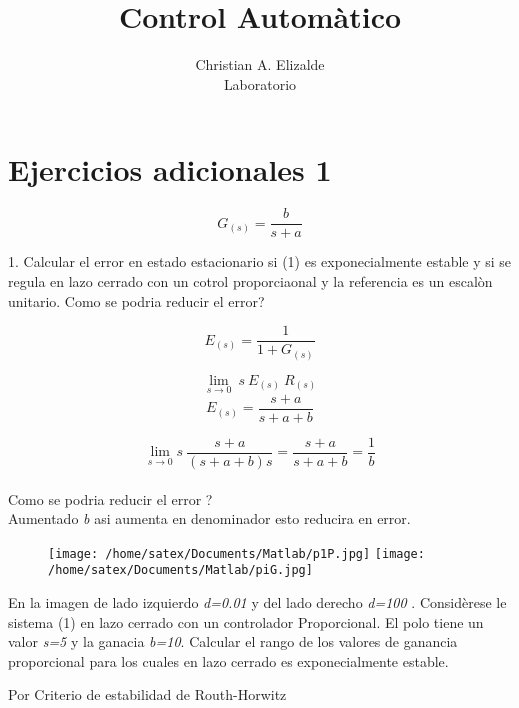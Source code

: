 \documentclass[11pt]{article}
\title{\textbf{Control Autom\`atico}}
\author{Christian A. Elizalde \\ Laboratorio}
\date{}
\begin{document}
\maketitle

\section{Ejercicios adicionales 1}
		\begin{equation}
	G_{(s)} = \frac{b}{s+a}
	\end{equation}

1. Calcular el error en estado estacionario si (1) es exponecialmente estable y si se regula en lazo cerrado con un cotrol proporciaonal y la referencia es un escal\`on unitario. Como se podria reducir el error? 

		\begin{equation} 
		E_{(s)} = \frac{1}{ 1 + G_{(s)}} \nonumber  
		\end{equation}	
		
		\begin{equation}
		\lim_{s \rightarrow 0 } \ s \ E_{(s)} \ R_{(s)}	\nonumber
 \end{equation}
		\begin{equation}
		E_{(s)} = \frac{s+a}{s+a+b} \nonumber
			\end{equation}

	
			\begin{equation}
			\lim_{s\rightarrow 0} s \ \frac{s+a}{(s+a+b)s} = \frac{s+a}{s+a+b} = \frac{1}{b} \nonumber
\end{equation}
\\
Como se podria reducir el error ? \\ Aumentado \emph{b} asi aumenta en denominador  esto reducira en error.
\\

\begin{figure}[htp]
\centering
\texttt{[image: /home/satex/Documents/Matlab/p1P.jpg]}
\texttt{[image: /home/satex/Documents/Matlab/piG.jpg]}
\end{figure}

En la imagen de lado izquierdo \emph{d=0.01} y del lado derecho \emph{d=100}
. Consid\`erese le sistema (1) en lazo cerrado con un controlador  Proporcional. El polo tiene un valor \emph{s=5} y la ganacia \emph{b=10}. Calcular el rango de los valores de ganancia proporcional para los cuales en lazo cerrado es exponecialmente estable. 

\begin{center}Por Criterio de estabilidad de Routh-Horwitz\end{center}
\end{document}
